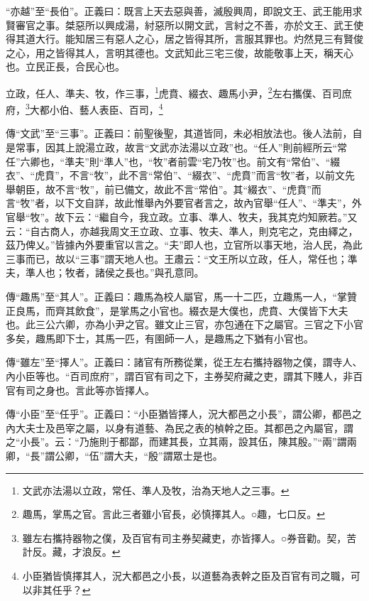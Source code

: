 {\noindent\shu{}\fzkt “亦越”至“長伯”。正義曰：既言上天去惡與善，滅殷興周，即說文王、武王能用求賢審官之事。桀惡所以興成湯，紂惡所以開文武，言紂之不善，亦於文王、武王使得其道大行。能知居三有惡人之心，居之皆得其所，言服其罪也。灼然見三有賢俊之心，用之皆得其人，言明其德也。文武知此三宅三俊，故能敬事上天，稱天心也。立民正長，合民心也。 \par}

立政，任人、準夫、牧，作三事，\footnote{文武亦法湯以立政，常任、準人及牧，治為天地人之三事。}虎賁、綴衣、趣馬小尹，\footnote{趣馬，掌馬之官。言此三者雖小官長，必慎擇其人。○趣，七口反。}左右攜僕、百司庶府，\footnote{雖左右攜持器物之僕，及百官有司主券契藏吏，亦皆擇人。○券音勸。契，苦計反。藏，才浪反。}大都小伯、藝人表臣、百司，\footnote{小臣猶皆慎擇其人，況大都邑之小長，以道藝為表幹之臣及百官有司之職，可以非其任乎？}


{\noindent\zhuan{}\fzbyks 傳“文武”至“三事”。正義曰：前聖後聖，其道皆同，未必相放法也。後人法前，自是常事，因其上說湯立政，故言“文武亦法湯以立政”也。“任人”則前經所云“常任”六卿也，“準夫”則“準人”也，“牧”者前雲“宅乃牧”也。前文有“常伯”、“綴衣”、“虎賁”，不言“牧”，此不言“常伯”、“綴衣”、“虎賁”而言“牧”者，以前文先舉朝臣，故不言“牧”，前已備文，故此不言“常伯”。其“綴衣”、“虎賁”而言“牧”者，以下文自詳，故此惟舉內外要官者言之，故內官舉“任人”、“準夫”，外官舉“牧”。故下云：“繼自今，我立政。立事、準人、牧夫，我其克灼知厥若。”又云：“自古商人，亦越我周文王立政、立事、牧夫、準人，則克宅之，克由繹之，茲乃俾乂。”皆據內外要重官以言之。“夫”即人也，立官所以事天地，治人民，為此三事而已，故以“三事”謂天地人也。王肅云：“文王所以立政，任人，常任也；準夫，準人也；牧者，諸侯之長也。”與孔意同。 \par}

{\noindent\zhuan{}\fzbyks 傳“趣馬”至“其人”。正義曰：趣馬為校人屬官，馬一十二匹，立趣馬一人，“掌贊正良馬，而齊其飲食”，是掌馬之小官也。綴衣是大僕也，虎賁、大僕皆下大夫也。此三公六卿，亦為小尹之官。雖文止三官，亦包通在下之屬官。三官之下小官多矣，趣馬即下士，其馬一匹，有圉師一人，是趣馬之下猶有小官也。 \par}

{\noindent\zhuan{}\fzbyks 傳“雖左”至“擇人”。正義曰：諸官有所務從業，從王左右攜持器物之僕，謂寺人、內小臣等也。“百司庶府”，謂百官有司之下，主券契府藏之吏，謂其下賤人，非百官有司之身也。言此等亦皆擇人。 \par}

{\noindent\zhuan{}\fzbyks 傳“小臣”至“任乎”。正義曰：“小臣猶皆擇人，況大都邑之小長”，謂公卿，都邑之內大夫士及邑宰之屬，以身有道藝、為民之表的楨幹之臣。其都邑之內屬官，謂之“小長”。云：“乃施則于都鄙，而建其長，立其兩，設其伍，陳其殷。”“兩”謂兩卿，“長”謂公卿，“伍”謂大夫，“殷”謂眾士是也。 \par}

